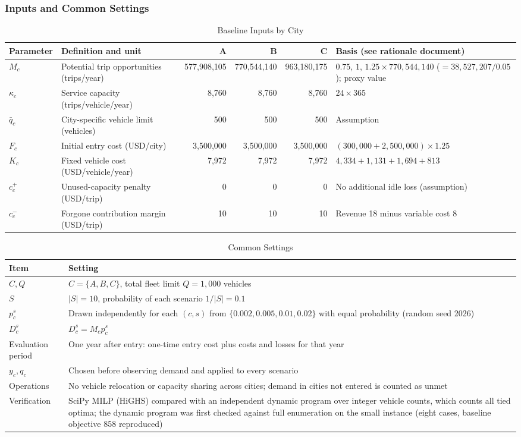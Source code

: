 \documentclass[10pt,a4paper]{article}
\begin{document}
\subsubsection{Inputs and Common Settings}
\begin{table}[H]
\centering\small
\caption{Baseline Inputs by City}\label{tab:an-input}
\footnotesize
\begin{tabular}{lP{.30\linewidth}rrrP{.25\linewidth}}
\toprule
Parameter & Definition and unit & A & B & C & Basis (see rationale document)\\\midrule
$M_c$ & Potential trip opportunities (trips/year) & 577{,}908{,}105 & 770{,}544{,}140 & 963{,}180{,}175 & $0.75$, $1$, $1.25\times770{,}544{,}140$ ($=38{,}527{,}207/0.05$); proxy value\\
$\kappa_c$ & Service capacity (trips/vehicle/year) & 8{,}760 & 8{,}760 & 8{,}760 & $24\times365$\\
$\bar q_c$ & City-specific vehicle limit (vehicles) & 500 & 500 & 500 & Assumption\\
$F_c$ & Initial entry cost (USD/city) & 3{,}500{,}000 & 3{,}500{,}000 & 3{,}500{,}000 & $(300{,}000+2{,}500{,}000)\times1.25$\\
$K_c$ & Fixed vehicle cost (USD/vehicle/year) & 7{,}972 & 7{,}972 & 7{,}972 & $4{,}334+1{,}131+1{,}694+813$\\
$c_c^+$ & Unused-capacity penalty (USD/trip) & 0 & 0 & 0 & No additional idle loss (assumption)\\
$c_c^-$ & Forgone contribution margin (USD/trip) & 10 & 10 & 10 & Revenue 18 minus variable cost 8\\
\bottomrule
\end{tabular}
\end{table}
\begin{table}[H]
\centering\small
\caption{Common Settings}\label{tab:an-common}
\begin{tabular}{P{.19\linewidth}P{.72\linewidth}}
\toprule
Item & Setting\\\midrule
$C,Q$ & $C=\{A,B,C\}$, total fleet limit $Q=1{,}000$ vehicles\\
$S$ & $|S|=10$, probability of each scenario $1/|S|=0.1$\\
$p_c^s$ & Drawn independently for each $(c,s)$ from $\{0.002,0.005,0.01,0.02\}$ with equal probability (random seed 2026)\\
$D_c^s$ & $D_c^s=M_cp_c^s$\\
Evaluation period & One year after entry: one-time entry cost plus costs and losses for that year\\
$y_c,q_c$ & Chosen before observing demand and applied to every scenario\\
Operations & No vehicle relocation or capacity sharing across cities; demand in cities not entered is counted as unmet\\
Verification & SciPy MILP (HiGHS) compared with an independent dynamic program over integer vehicle counts, which counts all tied optima; the dynamic program was first checked against full enumeration on the small instance (eight cases, baseline objective 858 reproduced)\\
\bottomrule
\end{tabular}
\end{table}
\end{document}
